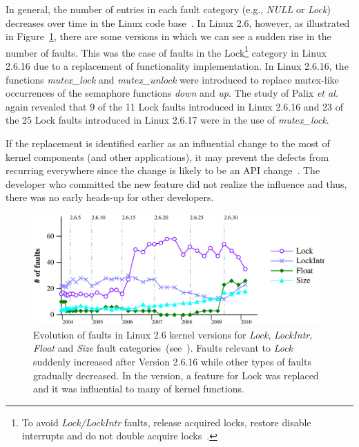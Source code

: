 In general, the number of entries in each fault category (e.g., {\em NULL} or {\em Lock})
decreases over
time in the Linux code base~\cite{Palix10Faults}.
In Linux 2.6, however, as illustrated in Figure~\ref{fig:lock_rise}, there are
some versions in which we can see a sudden rise in the number of faults.
This was the case of faults in the Lock\footnote{To avoid {\em Lock/LockIntr}
faults, release acquired locks, restore disable interrupts and do not double
acquire locks~\cite{Palix10Faults,Diagnosys}.
} 
category in Linux 2.6.16 due to a replacement of
functionality implementation.
In Linux 2.6.16, the functions {\em mutex\_lock} and {\em mutex\_unlock} were
introduced to replace mutex-like occurrences of the semaphore functions {\em
down} and {\em up}. The study of Palix {\em et al.} again revealed that 9 of the
11 Lock faults introduced in Linux  2.6.16 and 23 of the 25 Lock faults
introduced in Linux 2.6.17 were in the use of {\em mutex\_lock}.

If the replacement is identified earlier as an influential change to the most of
kernel components (and other applications), it may prevent the defects from
recurring everywhere since the change is likely to be an API
change~\cite{linares-vasquez_api_2013,dig_how_2006}.
The developer who committed the new feature did not realize the influence and thus,
there was no early heads-up for other developers.


\begin{figure}[h!]%
\includegraphics[width=\linewidth]{fig/feature-replacement} \caption{Evolution
of faults in Linux 2.6 kernel versions for {\em Lock}, {\em LockIntr}, {\em
Float} and {\em Size} fault categories~(see~\cite{Palix10Faults}). Faults
relevant to \emph{Lock} suddenly increased after Version 2.6.16 while other
types of faults gradually decreased. In the version, a feature for Lock was
replaced and it was influential to many of kernel functions.}
\label{fig:lock_rise}
\end{figure}


